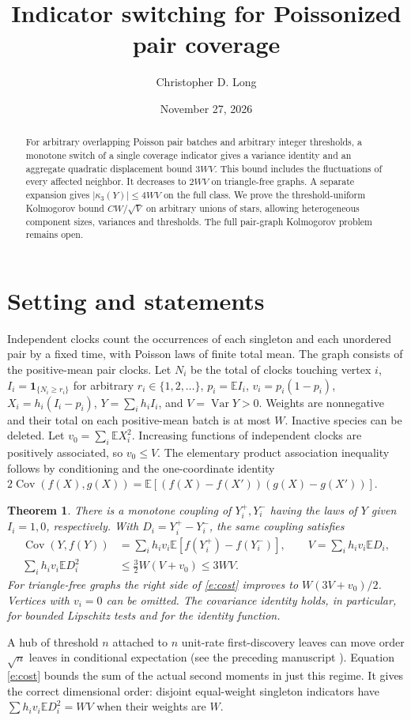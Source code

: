 \documentclass[11pt]{article}
\title{Indicator switching for Poissonized pair coverage}
\author{Christopher D. Long}
\date{November 27, 2026}
\newtheorem{theorem}{Theorem}[section]
\newcommand{\E}{\mathbb E}
\newcommand{\Var}{\operatorname{Var}}
\newcommand{\Cov}{\operatorname{Cov}}
\newcommand{\ind}{\mathbf1}
\numberwithin{equation}{section}
\begin{document}
\maketitle
\begin{abstract}
For arbitrary overlapping Poisson pair batches and arbitrary integer thresholds, a monotone switch
of a single coverage indicator gives a variance identity and an aggregate quadratic displacement
bound $3W V$. This bound includes the fluctuations of every affected neighbor.
It decreases to $2WV$ on triangle-free graphs. A separate expansion gives
$|\kappa_3(Y)|\le4WV$ on the full class. We prove the threshold-uniform Kolmogorov bound
$CW/\sqrt V$ on arbitrary unions of stars, allowing heterogeneous component sizes,
variances and thresholds. The full pair-graph Kolmogorov problem remains open.
\end{abstract}

\section{Setting and statements}
Independent clocks count the occurrences of each singleton and each unordered pair by a fixed
time, with Poisson laws of finite total mean. The graph consists of the positive-mean pair clocks.
Let $N_i$ be the total of clocks touching vertex $i$, $I_i=\ind_{\{N_i\ge r_i\}}$ for arbitrary
$r_i\in\{1,2,\ldots\}$, $p_i=\E I_i$, $v_i=p_i(1-p_i)$, $X_i=h_i(I_i-p_i)$,
$Y=\sum_i h_i I_i$, and $V=\Var Y>0$. Weights are nonnegative and their total on each
positive-mean batch is at most $W$. Inactive species can be deleted. Let $v_0=\sum_i\E X_i^2$.
Increasing functions of independent clocks are positively associated, so $v_0\le V$.
The elementary product association inequality follows by conditioning and the one-coordinate
identity $2\Cov(f(X),g(X))=\E[(f(X)-f(X'))(g(X)-g(X'))]$.

\begin{theorem}\label{t:cost}
There is a monotone coupling of $Y_i^+,Y_i^-$ having the laws of $Y$ given
$I_i=1,0$, respectively. With $D_i=Y_i^+-Y_i^-$, the same coupling satisfies
\begin{align}
 \Cov(Y,f(Y))&=\sum_i h_i v_i\E[f(Y_i^+)-f(Y_i^-)],\qquad
 V=\sum_i h_i v_i\E D_i,\label{e:identity}\\
 \sum_i h_i v_i\E D_i^2&\le \tfrac32 W(V+v_0)\le3WV.\label{e:cost}
\end{align}
For triangle-free graphs the right side of \eqref{e:cost} improves to $W(3V+v_0)/2$.
Vertices with $v_i=0$ can be omitted. The covariance identity holds, in particular, for
bounded Lipschitz tests and for the identity function.
\end{theorem}
A hub of threshold $n$ attached to $n$ unit-rate first-discovery leaves can move order
$\sqrt n$ leaves in conditional expectation (see the preceding manuscript \cite{previous}).
Equation \eqref{e:cost} bounds the sum of the actual second moments in just this regime.
It gives the correct dimensional order: disjoint equal-weight singleton indicators have
$\sum h_i v_i\E D_i^2=WV$ when their weights are $W$.
\end{document}
